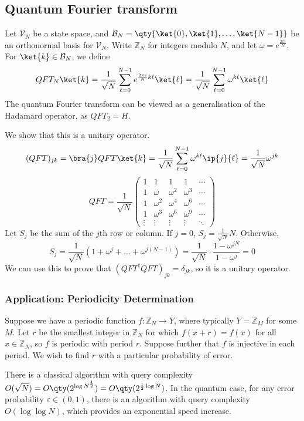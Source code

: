 \subsection{Quantum Fourier transform}
Let $\mathcal V_N$ be a state space, and $\mathcal B_N = \qty{\ket{0}, \ket{1}, \dots, \ket{N-1}}$ be an orthonormal basis for $\mathcal V_N$.
Write $\mathbb Z_N$ for integers modulo $N$, and let $\omega = e^{\frac{2\pi i}{N}}$.
For $\ket{k} \in \mathcal B_N$, we define
\[ QFT_N\ket{k} = \frac{1}{\sqrt{N}} \sum_{\ell=0}^{N-1} e^{\frac{2\pi i}{N}k\ell} \ket{\ell} = \frac{1}{\sqrt{N}} \sum_{\ell=0}^{N-1} \omega^{k\ell} \ket{\ell} \]
The quantum Fourier transform can be viewed as a generalisation of the Hadamard operator, as $QFT_2 = H$.

We show that this is a unitary operator.
\[ (QFT)_{jk} = \bra{j}QFT\ket{k} = \frac{1}{\sqrt{N}} \sum_{\ell=0}^{N-1} \omega^{k\ell} \ip{j}{\ell} = \frac{1}{\sqrt{N}} \omega^{jk} \]
\[ QFT = \frac{1}{\sqrt{N}} \begin{pmatrix}
    1 & 1 & 1 & 1 & \cdots \\
    1 & \omega & \omega^2 & \omega^3 & \cdots \\
    1 & \omega^2 & \omega^4 & \omega^6 & \cdots \\
    1 & \omega^3 & \omega^6 & \omega^9 & \cdots \\
    \vdots & \vdots & \vdots & \vdots & \ddots
\end{pmatrix} \]
Let $S_j$ be the sum of the $j$th row or column.
If $j = 0$, $S_j = \frac{1}{\sqrt{N}} N$.
Otherwise,
\[ S_j = \frac{1}{\sqrt{N}} (1 + \omega^j + \dots + \omega^{j(N-1)}) = \frac{1}{\sqrt{N}} \cdot \frac{1 - \omega^{jN}}{1 - \omega^j} = 0 \]
We can use this to prove that $(QFT^\dagger QFT)_{jk} = \delta_{jk}$, so it is a unitary operator.

\subsubsection{Application: Periodicity Determination}

Suppose we have a periodic function $f \colon \mathbb Z_N \to Y$, where typically $Y = \mathbb Z_M$ for some $M$.
Let $r$ be the smallest integer in $\mathbb Z_N$ for which $f(x+r) = f(x)$ for all $x \in \mathbb Z_N$, so $f$ is periodic with period $r$.
Suppose further that $f$ is injective in each period.
We wish to find $r$ with a particular probability of error.

There is a classical algorithm with query complexity $O(\sqrt{N}) = O\qty(2^{\log N^{\frac{1}{2}}}) = O\qty(2^{\frac{1}{2} \log N})$.
In the quantum case, for any error probability $\varepsilon \in (0,1)$, there is an algorithm with query complexity $O(\log \log N)$, which provides an exponential speed increase.

